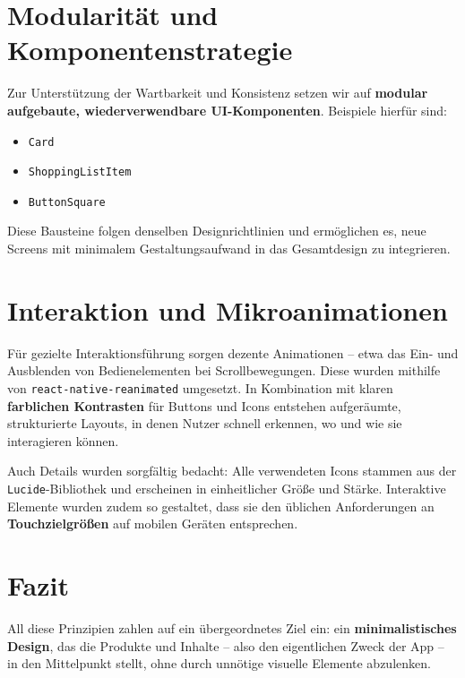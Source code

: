 \section{Modularität und Komponentenstrategie}

Zur Unterstützung der Wartbarkeit und Konsistenz setzen wir auf \textbf{modular aufgebaute, wiederverwendbare UI-Komponenten}. Beispiele hierfür sind:

\begin{itemize}
    \item \texttt{Card}
    \item \texttt{ShoppingListItem}
    \item \texttt{ButtonSquare}
\end{itemize}

Diese Bausteine folgen denselben Designrichtlinien und ermöglichen es, neue Screens mit minimalem Gestaltungsaufwand in das Gesamtdesign zu integrieren.

\section{Interaktion und Mikroanimationen}

Für gezielte Interaktionsführung sorgen dezente Animationen – etwa das Ein- und Ausblenden von Bedienelementen bei Scrollbewegungen. Diese wurden mithilfe von \texttt{react-native-reanimated} umgesetzt. In Kombination mit klaren \textbf{farblichen Kontrasten} für Buttons und Icons entstehen aufgeräumte, strukturierte Layouts, in denen Nutzer schnell erkennen, wo und wie sie interagieren können.

Auch Details wurden sorgfältig bedacht: Alle verwendeten Icons stammen aus der \texttt{Lucide}-Bibliothek und erscheinen in einheitlicher Größe und Stärke. Interaktive Elemente wurden zudem so gestaltet, dass sie den üblichen Anforderungen an \textbf{Touchzielgrößen} auf mobilen Geräten entsprechen.

\section{Fazit}

All diese Prinzipien zahlen auf ein übergeordnetes Ziel ein: ein \textbf{minimalistisches Design}, das die Produkte und Inhalte – also den eigentlichen Zweck der App – in den Mittelpunkt stellt, ohne durch unnötige visuelle Elemente abzulenken.
